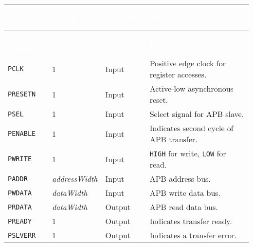 \begin{longtable}[H]{
  | p{}
  | p{}
  | p{}
  | p{} |
}
\hline
\rowcolor{gray}
\textcolor{white}{\textbf{Port Name}} &
\textcolor{white}{\textbf{Width}} &
\textcolor{white}{\textbf{Direction}} &
\textcolor{white}{\textbf{Description}} \\ 
\hline
\endfirsthead

\hline
\rowcolor{gray}
\textcolor{white}{\textbf{Port Name}} &
\textcolor{white}{\textbf{Width}} &
\textcolor{white}{\textbf{Direction}} &
\textcolor{white}{\textbf{Description}}\\ 
\hline
\endhead

\hline
\endfoot

\texttt{PCLK} &
1 &
Input &
Positive edge clock for register accesses. \\ \hline

\texttt{PRESETN} &
1 &
Input &
Active-low asynchronous reset. \\ \hline

\texttt{PSEL} &
1 &
Input &
Select signal for APB slave. \\ \hline

\texttt{PENABLE} &
1 &
Input &
Indicates second cycle of APB transfer. \\ \hline

\texttt{PWRITE} &
1 &
Input &
\texttt{HIGH} for write, \texttt{LOW} for read. \\ \hline

\texttt{PADDR} &
\textit{addressWidth} &
Input &
APB address bus. \\ \hline

\texttt{PWDATA} &
\textit{dataWidth} &
Input &
APB write data bus. \\ \hline

\texttt{PRDATA} &
\textit{dataWidth} &
Output &
APB read data bus. \\ \hline

\texttt{PREADY} &
1 &
Output &
Indicates transfer ready. \\ \hline

\texttt{PSLVERR} &
1 &
Output &
Indicates a transfer error. \\ \hline

\end{longtable}
\label{table:uart_apb_ports}
\endgroup
